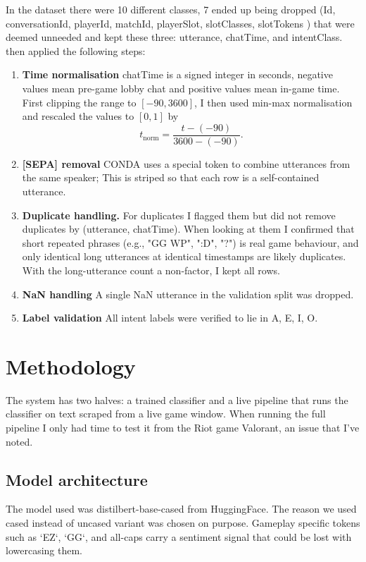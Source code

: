 \documentclass[a4paper,10.5pt,twoside]{article}
\begin{document}
In the dataset there were 10 different classes, 7 ended up being dropped (Id, conversationId, playerId, matchId, playerSlot, slotClasses, slotTokens ) that were deemed unneeded and kept these three: utterance, chatTime, and intentClass.  then applied the following steps:

\begin{enumerate}
    \item \textbf{Time normalisation} chatTime is a signed integer in seconds, negative values mean pre-game lobby chat and positive values mean in-game time. First clipping the range to $[-90, 3600]$, I then used min-max normalisation and rescaled the values to $[0, 1]$ by
    \[
        t_{\text{norm}} = \frac{t - (-90)}{3600 - (-90)}.
    \]
    \item \textbf{[SEPA] removal}  CONDA uses a special token to combine utterances from the same speaker; This is striped so that each row is a self-contained utterance.
    \item \textbf{Duplicate handling.} For duplicates I flagged them but did not remove duplicates by (utterance, chatTime). When looking at them I confirmed that short repeated phrases (e.g., "GG WP", ":D", "?") is real game behaviour, and only identical long utterances at identical timestamps are likely duplicates. With the long-utterance count a non-factor, I kept all rows.   
    \item  \textbf{NaN handling} A single NaN utterance in the validation split was dropped.
    \item  \textbf{Label validation} All intent labels were verified to lie in {A, E, I, O}.
\end{enumerate}

\section{Methodology}
The system has two halves: a trained classifier and a live pipeline that runs the classifier on text scraped from a live game window. When running the full pipeline I only had time to test it from the Riot game Valorant, an issue that I’ve noted. 
\vspace{1em}

\subsection{Model architecture}
The model used was distilbert-base-cased from HuggingFace. The reason we used cased instead of uncased variant was chosen on purpose. Gameplay specific tokens such as `EZ`, `GG`, and all-caps carry a sentiment signal that could be lost with lowercasing them.
\vspace{1em}
\end{document}
